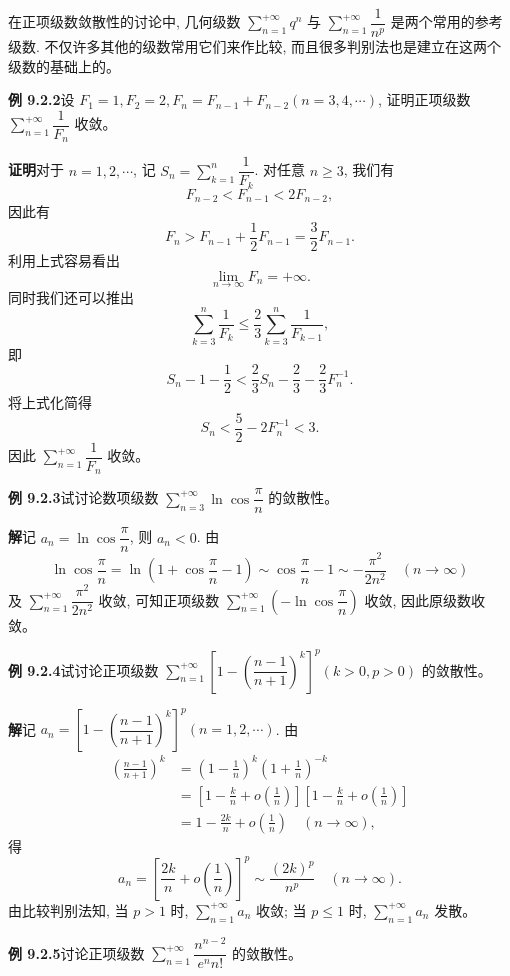 \documentclass[UTF8,12pt,a4paper,fontset=fandol]{ctexart}
\begin{document}
在正项级数敛散性的讨论中, 几何级数 $\sum\limits_{n=1}^{+\infty}q^n$ 与 $\sum\limits_{n=1}^{+\infty}\dfrac1{n^p}$ 是两个常用的参考级数. 不仅许多其他的级数常用它们来作比较, 而且很多判别法也是建立在这两个级数的基础上的。

\noindent\textbf{例 9.2.2}\quad 设 $F_1=1,F_2=2,F_n=F_{n-1}+F_{n-2}(n=3,4,\cdots)$, 证明正项级数 $\sum\limits_{n=1}^{+\infty}\dfrac1{F_n}$ 收敛。

\noindent\textbf{证明}\quad 对于 $n=1,2,\cdots$, 记 $S_n=\sum\limits_{k=1}^n\dfrac1{F_k}$. 对任意 $n\geq3$, 我们有
\[
  F_{n-2}<F_{n-1}<2F_{n-2},
\]
因此有
\[
  F_n>F_{n-1}+\frac12F_{n-1}=\frac32F_{n-1}.
\]
利用上式容易看出
\[
  \lim_{n\to\infty}F_n=+\infty.
\]
同时我们还可以推出
\[
  \sum_{k=3}^n\frac1{F_k}\leq\frac23\sum_{k=3}^n\frac1{F_{k-1}},
\]
即
\[
  S_n-1-\frac12<\frac23S_n-\frac23-\frac23F_n^{-1}.
\]
将上式化简得
\[
  S_n<\frac52-2F_n^{-1}<3.
\]
因此 $\sum\limits_{n=1}^{+\infty}\dfrac1{F_n}$ 收敛。

\noindent\textbf{例 9.2.3}\quad 试讨论数项级数 $\sum\limits_{n=3}^{+\infty}\ln\cos\dfrac{\pi}{n}$ 的敛散性。

\noindent\textbf{解}\quad 记 $a_n=\ln\cos\dfrac{\pi}{n}$, 则 $a_n<0$. 由
\[
  \ln\cos\frac{\pi}{n}
  =\ln\left(1+\cos\frac{\pi}{n}-1\right)
  \sim \cos\frac{\pi}{n}-1\sim-\frac{\pi^2}{2n^2}\quad(n\to\infty)
\]
及 $\sum\limits_{n=1}^{+\infty}\dfrac{\pi^2}{2n^2}$ 收敛, 可知正项级数 $\sum\limits_{n=1}^{+\infty}\left(-\ln\cos\dfrac{\pi}{n}\right)$ 收敛, 因此原级数收敛。

\noindent\textbf{例 9.2.4}\quad 试讨论正项级数 $\sum\limits_{n=1}^{+\infty}\left[1-\left(\dfrac{n-1}{n+1}\right)^k\right]^p(k>0,p>0)$ 的敛散性。

\noindent\textbf{解}\quad 记 $a_n=\left[1-\left(\dfrac{n-1}{n+1}\right)^k\right]^p(n=1,2,\cdots)$. 由
\[
\begin{aligned}
  \left(\frac{n-1}{n+1}\right)^k
  &=\left(1-\frac1n\right)^k\left(1+\frac1n\right)^{-k}\\
  &=\left[1-\frac{k}{n}+o\left(\frac1n\right)\right]\left[1-\frac{k}{n}+o\left(\frac1n\right)\right]\\
  &=1-\frac{2k}{n}+o\left(\frac1n\right)\quad(n\to\infty),
\end{aligned}
\]
得
\[
  a_n=\left[\frac{2k}{n}+o\left(\frac1n\right)\right]^p\sim\frac{(2k)^p}{n^p}\quad(n\to\infty).
\]
由比较判别法知, 当 $p>1$ 时, $\sum\limits_{n=1}^{+\infty}a_n$ 收敛; 当 $p\leq1$ 时, $\sum\limits_{n=1}^{+\infty}a_n$ 发散。

\noindent\textbf{例 9.2.5}\quad 讨论正项级数 $\sum\limits_{n=1}^{+\infty}\dfrac{n^{n-2}}{e^n n!}$ 的敛散性。
\end{document}
